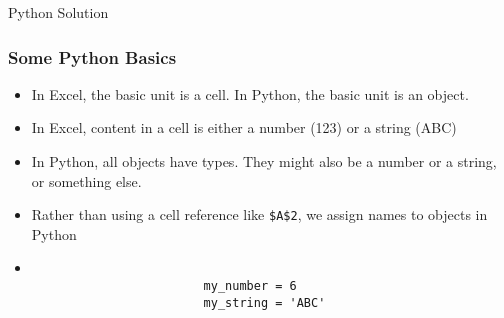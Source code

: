 \documentclass[handout, 11pt]{beamer}
\begin{document}
\begin{section}{Python Solution}
\begin{frame}[fragile]
\frametitle{Some Python Basics}
\begin{itemize}
\item In Excel, the basic unit is a cell. In Python, the basic unit is an object.
\vfill
\item In Excel, content in a cell is either a number (123) or a string (ABC)
\vfill
\item In Python, all objects have types. They might also be a number or a string, or something else.
\vfill
\item Rather than using a cell reference like \texttt{\$A\$2}, we assign names to objects in Python
\vfill
\item \begin{verbatim}

                        my_number = 6
                        my_string = 'ABC'
                        

\end{verbatim}
\end{itemize}
\end{frame}
\end{section}
\end{document}
